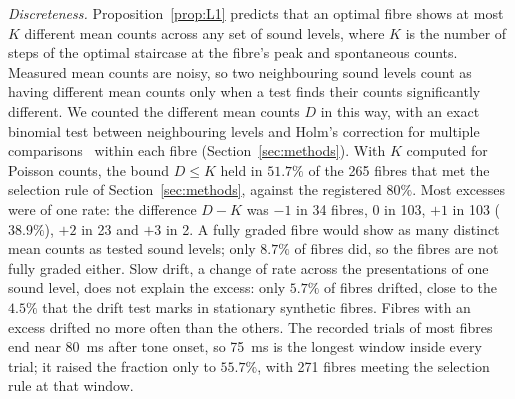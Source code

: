 \documentclass[10pt,letterpaper]{article}
\begin{document}
\emph{Discreteness.} Proposition~\ref{prop:L1} predicts that an optimal fibre shows at most $K$ different mean counts across any set of
sound levels, where $K$ is the number of steps of the optimal staircase at the fibre's peak and spontaneous counts. Measured
mean counts are noisy, so two neighbouring sound levels count as having different mean counts only when a test finds their counts
significantly different. We counted the different mean counts $D$ in this way, with an exact binomial test between neighbouring levels
and Holm's correction for multiple comparisons~\cite{Holm1979} within each fibre (Section~\ref{sec:methods}). With $K$ computed for Poisson counts,
the bound $D\le K$ held in $51.7\%$ of the 265 fibres that met the selection rule of Section~\ref{sec:methods}, against the
registered $80\%$. Most excesses were of one rate: the difference
$D-K$ was $-1$ in 34 fibres, $0$ in 103, $+1$ in 103 ($38.9\%$), $+2$ in 23 and $+3$ in 2. A fully graded fibre would show as many distinct mean counts as tested sound
levels; only $8.7\%$ of fibres did, so the fibres are not fully graded either. Slow drift, a change of rate across the presentations
of one sound level, does not explain the excess: only $5.7\%$ of fibres drifted, close to the $4.5\%$ that the drift test marks in stationary synthetic fibres. Fibres with
an excess drifted no more often than the others. The recorded trials of most fibres end near 80~ms after tone onset, so 75~ms is the
longest window inside every trial; it raised the fraction only to $55.7\%$, with 271 fibres meeting the selection rule at that
window.
\end{document}
